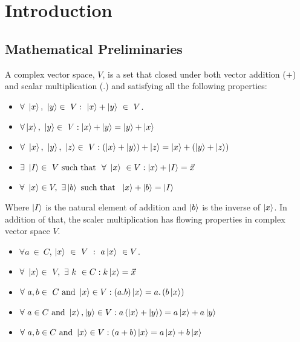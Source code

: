 \chapter{Introduction}

\section{ Mathematical Preliminaries }



\begin{defn}


A complex vector space, $V$, is a set that  closed under both vector addition
($ +$) and scalar multiplication (.) and satisfying all the following properties:
\begin{itemize}
\item $\forall~ \ket{x},~\ket{y} \in ~ V : ~\ket{x}+\ket{y} ~\in~ V $.
\item $\forall \ket{x},~\ket{y} \in ~ V : \ket{x}+\ket{y}=\ket{y}+\ket{x}$
\item $\forall~ \ket{x},~\ket{y}, ~\ket{z} \in ~ V:\left(\ket{x}+\ket{y}\right)+\ket{z}=\ket{x}+\left(\ket{y}+\ket{z}\right)$
\item $\exists ~\ket{I} \in ~V~ \text{such that }~ \forall~ \ket{x} ~\in V: \ket{x}+\ket{I}=\vec{x}$
\item $\forall ~\ket{x} \in V,~ \exists \ket{b} ~ \text{such that } ~\ket{x}+\ket{b}= \ket{I}$
\end{itemize}
Where $\ket{I}$ is the natural element of addition and $\ket{b}$ is the inverse of $\ket{x}$.
In addition of that, the scaler multiplication has flowing properties in complex vector space $V$.
\begin{itemize}
\item $\forall a~\in ~C$, $\ket{x}~\in ~V~ :~ a\ket{x}~ \in V$.
\item $\forall ~\ket{x} \in ~V,~ \exists~ k ~\in C :k\ket{x}=\vec{x}$
\item $\forall ~ a,b \in ~C ~\text{and} ~ \ket{x}\in V :\left(a.b\right) \ket{x}=a.\left(b \ket{x}\right)$
\item $\forall ~ a \in C ~\text{and} ~ \ket{x}, \ket{y}\in V:a\left(\ket{x}+\ket{y}\right)=a\ket{x}+a\ket{y}$
\item $\forall ~ a,b \in C ~\text{and} ~ \ket{x}\in V:\left(a+b\right)\ket{x}=a\ket{x}+b\ket{x}$
\end{itemize}
\end{defn}

